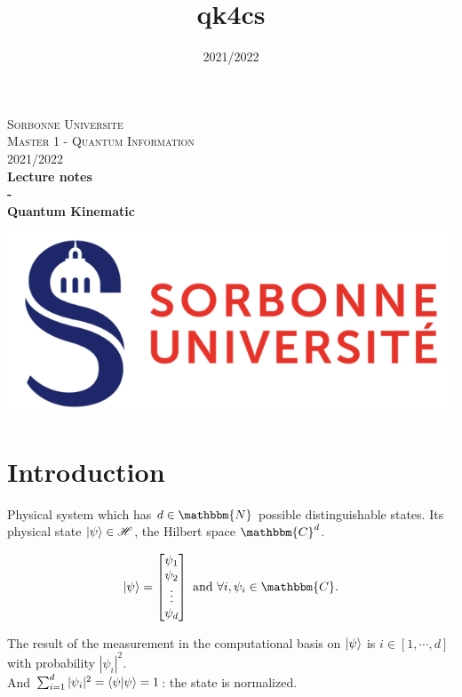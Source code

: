 \documentclass{article}
\title{qk4cs}
\author{}
\date{2021/2022}
\begin{document}
\begin{titlepage}
\begin{center}

\textsc{\LARGE Sorbonne Universite} \\[1cm]
\textsc{\LARGE Master 1 - Quantum Information} \\[1cm]
\textsc{\Large 2021/2022} \\[7cm]


{\huge \bfseries Lecture notes} \\[0.5cm]
{\huge \bfseries -} \\[0.5cm]
{\huge \bfseries Quantum Kinematic} \\[4cm]
\vfill

\includegraphics[scale=0.7]{su.png}

\end{center}
\end{titlepage}

\tableofcontents

\newpage

\section{Introduction}
Physical system which has $d \in \mathbbm{N}$ possible distinguishable states.
Its physical state $\ket{\psi} \in \mathscr{H}$, the Hilbert space
$\mathbbm{C}^d$.

\begin{equation}
    \ket{\psi} = \begin{bmatrix} \psi_1\\ \psi_2 \\ \vdots \\ \psi_d\end{bmatrix}
    \text{ and } \forall i, \psi_i \in \mathbbm{C}.
\end{equation}


\noindent
The result of the measurement in the computational basis on $\ket{\psi}$ is $i
\in [1, \cdots, d]$ with probability $|\psi_i|^2$. \\ \noindent And
$\sum_{i=1}^d |\psi_i|^2 = \braket{\psi|\psi} = 1$: the state is normalized.
\end{document}
